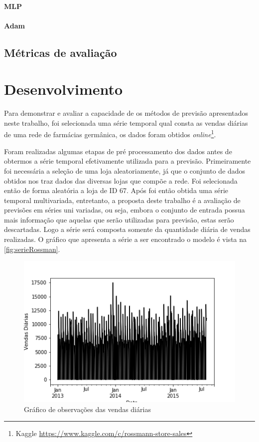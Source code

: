 \documentclass[
    12pt,
    oneside,
    a4paper,
    english,
    brazil
]{abntex2}
\begin{document}

\subsubsection{MLP}

\subsubsection{Adam}

\section{Métricas de avaliação}

\chapter{Desenvolvimento}\label{chap:desev}

Para demonstrar e avaliar a capacidade de os métodos de previsão apresentados
neste trabalho, foi selecionada uma série temporal qual consta as vendas
diárias de uma rede de farmácias germânica, os dados foram obtidos
\textit{online}\footnote{Kaggle
    \url{https://www.kaggle.com/c/rossmann-store-sales}}.

Foram realizadas algumas etapas de pré processamento dos dados antes de
obtermos a série temporal efetivamente utilizada para a previsão.
Primeiramente foi necessária a seleção de uma loja aleatoriamente, já que o
conjunto de dados obtidos nos traz dados das diversas lojas que compõe a rede.
Foi selecionada então de forma aleatória a loja de ID 67. Após foi então obtida
uma série temporal multivariada, entretanto, a proposta deste trabalho é a
avaliação de previsões em séries uni variadas, ou seja, embora o conjunto de
entrada possua mais informação que aquelas que serão utilizadas para previsão,
estas serão descartadas. Logo a série será composta somente da quantidade
diária de vendas realizadas. O gráfico que apresenta a série a ser encontrado o
modelo é vista na \autoref{fig:serieRossman}.

\begin{figure}[ht]
    \centering
    \caption{Gráfico de observações das vendas diárias}\label{fig:serieRossman}
    \includegraphics[width=.6\textwidth]{images/graficoRossman.png}
\end{figure}
\end{document}
